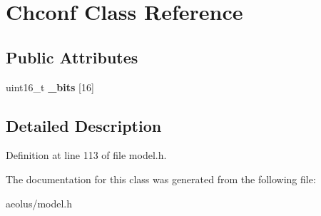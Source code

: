\hypertarget{class_chconf}{}\section{Chconf Class Reference}
\label{class_chconf}
\subsection*{Public Attributes}
\begin{DoxyCompactItemize}
\item 
\mbox{\label{class_chconf_a5a76e69c3b3ddd47172971abcca3c2f4}} 
uint16\+\_\+t {\bfseries \+\_\+bits} \mbox{[}16\mbox{]}
\end{DoxyCompactItemize}


\subsection{Detailed Description}


Definition at line 113 of file model.\+h.



The documentation for this class was generated from the following file\+:\begin{DoxyCompactItemize}
\item 
aeolus/model.\+h\end{DoxyCompactItemize}
